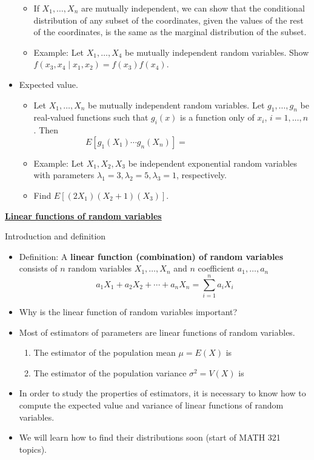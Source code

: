 \documentclass{article}
\newcommand{\bu}[1]{\textbf{\ul{#1}}}				%
\newcommand{\vecn}[2]{#1_1, \ldots, #1_{#2}}	%
\begin{document}
\begin{itemize}
\begin{itemize}
        \item If $\vecn{X}{n}$ are mutually independent, we can show that the conditional distribution of any subset of the coordinates, given the values of the rest of the coordinates, is the same as the marginal distribution of the subset.
        \item Example: Let $\vecn{X}{4}$ be mutually independent random variables. Show $f(x_3, x_4 \mid x_1, x_2) = f(x_3)  f(x_4)$.\vspace{60pt}
    \end{itemize}
    \item Expected value.    
    \begin{itemize}
        \item Let $\vecn{X}{n}$  be mutually independent random variables. Let $\vecn{g}{n}$ be real-valued functions such that $g_i(x)$ is a function only of $x_i$, $i = 1, \dots, n$. Then
        \[E[g_1(X_1) \cdots g_n(X_n)] = \hspace{100pt}\]
        \item Example: Let $X_1, X_2, X_3$ be independent exponential random variables with parameters $\lambda_1 = 3, \lambda_2 = 5, \lambda_3 = 1$, respectively.
        \item[] Find $E[(2X_1)(X_2 + 1) (X_3)]$.\vspace{60pt}
    \end{itemize}
\end{itemize}\bigskip

\bu{Linear functions of random variables}\bigskip
 
Introduction and definition\bigskip
\begin{itemize}
    \item Definition: A \textbf{linear function (combination) of random variables} consists of $n$ random variables $\vecn{X}{n}$ and $n$ coefficient $\vecn{a}{n}$
    \[a_1 X_1 + a_2 X_2 + \cdots + a_n X_n = \sum_{i = 1}^n a_i X_i\]
    \item Why is the linear function of random variables important?
    \item[] Most of estimators of parameters are linear functions of random variables. 
    \begin{enumerate}
        \item The estimator of the population mean $\mu = E(X)$ is\vspace{40pt}
        \item The estimator of the population variance $\sigma^2 = V(X)$ is\vspace{40pt}
    \end{enumerate}
    \item In order to study the properties of estimators, it is necessary to know how to compute the expected value and variance of linear functions of random variables.
    \item[] We will learn how to find their distributions soon (start of MATH 321 topics).
 \end{itemize}\bigskip
 
\end{document}
